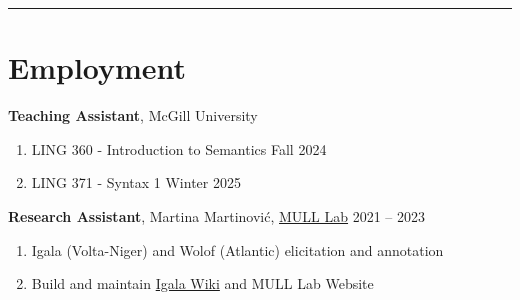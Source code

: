 \documentclass[margin,line]{resume}
\begin{document}
\begin{resume}
		\vspace{-0.7em}\rule{\textwidth}{0.4pt}


	\vspace{-0.5em}

	\newpage

	\section{\mysidestyle Employment}

	\textbf{Teaching Assistant}, 
	McGill University
	\begin{enumerate}[-, leftmargin=1em, topsep=2pt]
		\item[] LING 360 - Introduction to Semantics \hfill Fall 2024
		\item[] LING 371 - Syntax 1 \hfill Winter 2025
	\end{enumerate}


	\textbf{Research Assistant}, Martina Martinović, \href{https://mull-lab.org/}{MULL Lab} \hfill 2021 -- 2023
	\begin{enumerate}[-, leftmargin=1em, topsep=2pt]
		\item[] Igala (Volta-Niger) and Wolof (Atlantic) elicitation and annotation
		\item[] Build and maintain \href{https://wiki.mull-lab.org/Igala/}{Igala Wiki} and MULL Lab Website%
	\end{enumerate}%

	\begin{comment}
	\textbf{Full Stack and Mobile Developer}, \href{https://playmind.com/}{PLAYMIND}, Montr\'{e}al \hfill Mar -- Aug 2021
	\begin{enumerate}[-, leftmargin=1em, topsep=2pt]
		\item[] Developed~\href{https://playbox.games/\#home}{
			      PLAYBOX online management portal and Android App}
	\end{enumerate}

	\textbf{Freelance Programmer}, Montr\'{e}al \hfill 2019 -- 2020
	\begin{enumerate}[-, leftmargin=1em, topsep=2pt]
		\item[] Web Development and Python tutoring
	\end{enumerate}


\end{comment}
\end{resume}
\end{document}
